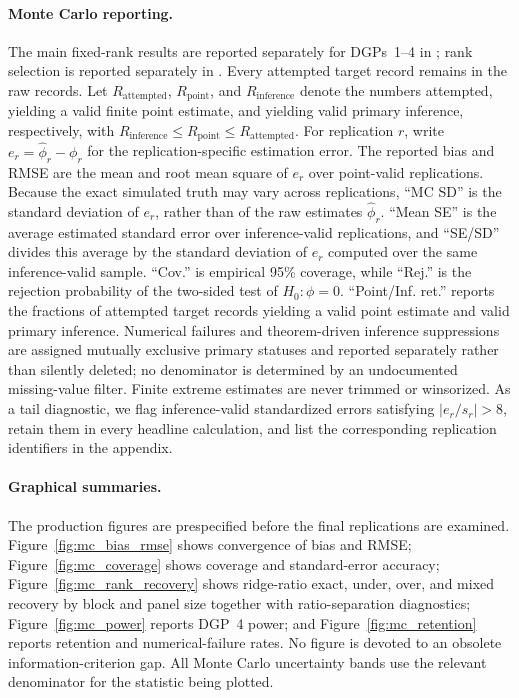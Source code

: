 \documentclass[11pt]{article}
\numberwithin{equation}{section}
\theoremstyle{remark}
\begin{document}
\paragraph{Monte Carlo reporting.}
The main fixed-rank results are reported separately for DGPs~1--4 in ; rank selection is reported separately in . Every attempted target record remains in the raw records. Let $R_{\mathrm{attempted}}$, $R_{\mathrm{point}}$, and $R_{\mathrm{inference}}$ denote the numbers attempted, yielding a valid finite point estimate, and yielding valid primary inference, respectively, with $R_{\mathrm{inference}}\le R_{\mathrm{point}}\le R_{\mathrm{attempted}}$. For replication $r$, write $e_r=\widehat\phi_r-\phi_r$ for the replication-specific estimation error. The reported bias and RMSE are the mean and root mean square of $e_r$ over point-valid replications. Because the exact simulated truth may vary across replications, ``MC SD'' is the standard deviation of $e_r$, rather than of the raw estimates $\widehat\phi_r$. ``Mean SE'' is the average estimated standard error over inference-valid replications, and ``SE/SD'' divides this average by the standard deviation of $e_r$ computed over the same inference-valid sample. ``Cov.'' is empirical 95\% coverage, while ``Rej.'' is the rejection probability of the two-sided test of $H_0:\phi=0$. ``Point/Inf. ret.'' reports the fractions of attempted target records yielding a valid point estimate and valid primary inference. Numerical failures and theorem-driven inference suppressions are assigned mutually exclusive primary statuses and reported separately rather than silently deleted; no denominator is determined by an undocumented missing-value filter. Finite extreme estimates are never trimmed or winsorized. As a tail diagnostic, we flag inference-valid standardized errors satisfying $|e_r/\widehat s_r|>8$, retain them in every headline calculation, and list the corresponding replication identifiers in the appendix.













\paragraph{Graphical summaries.}
The production figures are prespecified before the final replications are examined. Figure~\ref{fig:mc_bias_rmse} shows convergence of bias and RMSE; Figure~\ref{fig:mc_coverage} shows coverage and standard-error accuracy; Figure~\ref{fig:mc_rank_recovery} shows ridge-ratio exact, under, over, and mixed recovery by block and panel size together with ratio-separation diagnostics; Figure~\ref{fig:mc_power} reports DGP~4 power; and Figure~\ref{fig:mc_retention} reports retention and numerical-failure rates. No figure is devoted to an obsolete information-criterion gap. All Monte Carlo uncertainty bands use the relevant denominator for the statistic being plotted.
\end{document}
